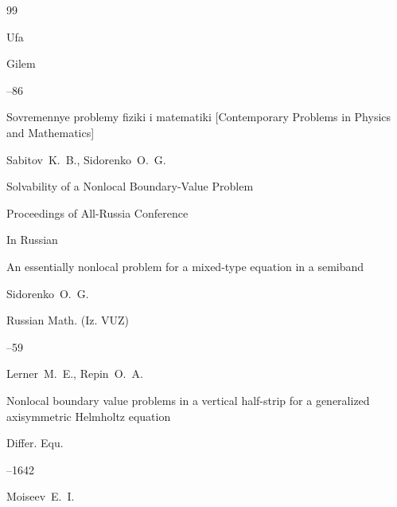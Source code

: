 \begin{thebibliography}{99}

\publaddr Ufa

\publ Gilem


--86


\inbook Sovremennye problemy fiziki i matematiki \rm [Contemporary Problems in Physics and Mathematics]

\by Sabitov~K.~B., Sidorenko~O.~G.

\paper Solvability of a Nonlocal Boundary-Value Problem

\bookinfo Proceedings of All-Russia Conference 

\lang In Russian








\paper An essentially nonlocal problem for a mixed-type equation in a semiband

\by  Sidorenko~O.~G.

\jour Russian Math. (Iz. VUZ)




--59








\by Lerner~M.~E., Repin~O.~A.

\paper Nonlocal boundary value problems in a vertical half-strip for a generalized axisymmetric Helmholtz equation

\jour Differ. Equ. 



--1642 







\by Moiseev~E.~I.


\end{thebibliography}
